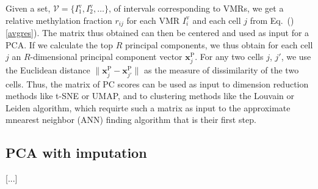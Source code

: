 \documentclass[twocolumn,10pt]{article}
\begin{document}
Given a set, $\mathcal{V}=\{I^\text{v}_1,I^\text{v}_2,\dots\}$, of intervals corresponding to VMRs, we get a relative methylation fraction $r_{ij}$ for each VMR $I^\text{v}_i$ and each cell $j$ from Eq.\ ()\ref{avgres}). The matrix thus obtained can then be centered and used as input for a PCA. If we calculate the top $R$ principal components, we thus obtain for each cell $j$ an $R$-dimensional principal component vector $\mathbf{x}^\text{P}_j$. For any two cells $j$, $j'$, we use the Euclidean distance $\|\mathbf{x}^\text{P}_j - \mathbf{x}^\text{P}_{j'}\|$ as the measure of dissimilarity of the two cells. Thus, the matrix of PC scores can be used as input to dimension reduction methods like t-SNE or UMAP, and to clustering methods like the Louvain or Leiden algorithm, which requirte such a matrix as input to the approximate mnearest neighbor (ANN) finding algorithm that is their first step.

\subsection{PCA with imputation}

[...]


{\small }
\end{document}
